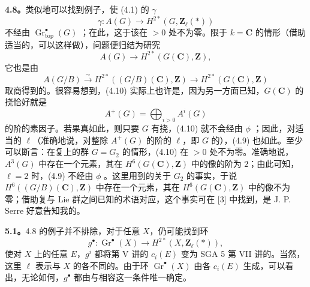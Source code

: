 \textbf{4.8。}类似地可以找到例子，使 (4.1) 的 $\gamma$
\[\gamma:A(G)\longrightarrow H^{2*}(G,\mathbf Z_\ell(*))\tag{4.9}\]
不经由 $\operatorname{Gr}_{\mathrm{top}}^\bullet(G)$ ；在此，这于该在 $>0$ 处不为零。限于 $k=\mathbf C$ 的情形（借助适当的，可以这样做），问题便归结为研究
\[A(G)\longrightarrow H^{2*}(G(\mathbf C),\mathbf Z),\tag{4.10}\]
它也是由
\[A(G/B)\xrightarrow{\sim}H^{2*}((G/B)(\mathbf C),\mathbf Z)
\longrightarrow H^{2*}(G(\mathbf C),\mathbf Z)\]
取商得到的。很容易想到，(4.10) 实际上也许是，因为另一方面已知，$G(\mathbf C)$ 的挠恰好就是
\[A^+(G)=\bigoplus_{i>0}A^i(G)\]
的阶的素因子。若果真如此，则只要 $G$ 有挠，(4.10) 就不会经由 $\phi$ ；因此，对适当的 $\ell$（准确地说，对整除 $A^+(G)$ 的阶的 $\ell$，即 $G$ 的），(4.9) 也如此。至少可以断言：在复上的群 $G=G_2$ 的情形，(4.10) 在 $>0$ 处不为零。准确地说，$A^3(G)$ 中存在一个元素，其在 $H^6(G(\mathbf C),\mathbf Z)$ 中的像的阶为 $2$；由此可知，$\ell=2$ 时，(4.9) 不经由 $\phi$ 。这里用到的关于 $G_2$ 的事实，于说 $H^6((G/B)(\mathbf C),\mathbf Z)$ 中存在一个元素，其在 $H^6(G(\mathbf C),\mathbf Z)$ 中的像不为零；借助复与 Lie 群之间已知的术语对应，这个事实可在 [3] 中找到，是 J. P. Serre 好意告知我的。

\textbf{5.1。}4.8 的例子并不排除，对于任意 $X$，仍可能找到环
\[g^\bullet:\operatorname{Gr}^\bullet(X)\longrightarrow
H^{2*}(X,\mathbf Z_\ell(*)),\]
使对 $X$ 上的任意 $E$，$g^i$ 都将第 V 讲的 $c_i(E)$ 变为 SGA 5 第 VII 讲的。当然，这里 $\ell$ 表示与 $X$ 的各不同的。由于环 $\operatorname{Gr}^\bullet(X)$ 由各 $c_i(E)$ 生成，可以看出，无论如何，$g^\bullet$ 都由与相容这一条件唯一确定。

